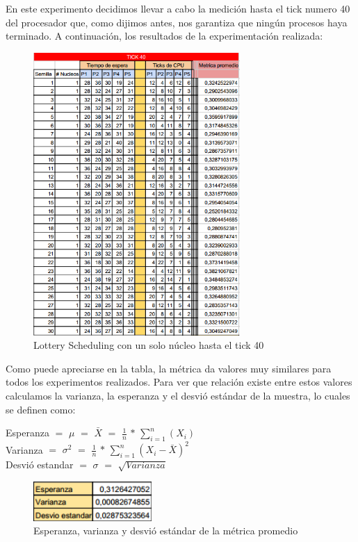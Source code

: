 En este experimento decidimos llevar a cabo la medición hasta el tick numero 40 del procesador que, como dijimos antes, nos garantiza que ningún procesos haya terminado.
A continuación, los resultados de la experimentación realizada:

\begin{figure}[H]
\begin{center}
\includegraphics[width=0.7\textwidth]{img/foto1.png}
     \caption{Lottery Scheduling con un solo núcleo hasta el tick 40}
\end{center}
\end{figure}


Como puede apreciarse en la tabla, la métrica da valores muy similares para todos los experimentos realizados.
Para ver que relación existe entre estos valores calculamos la varianza, la esperanza y el desvió estándar de la muestra, lo cuales se definen como:
\begin{center}
	Esperanza $=$ $\mu$ $=$ $\bar{X}$ $=$ $\frac{1}{n}$ $*$ $\sum_{i = 1}^{n}(X_i)$\\
	Varianza $=$ $\sigma^{2}$ $=$ $\frac{1}{n}$ $*$ $\sum_{i = 1}^{n} (X_i - \bar{X})^{2}$\\
	Desvió estandar $=$ $\sigma$ $=$ $\sqrt{Varianza}$	
\end{center}

\begin{figure}[H]
\begin{center}
\includegraphics[width=0.4\textwidth]{img/img3.png}
     \caption{Esperanza, varianza y desvió estándar de la métrica promedio}
\end{center}
\end{figure}


